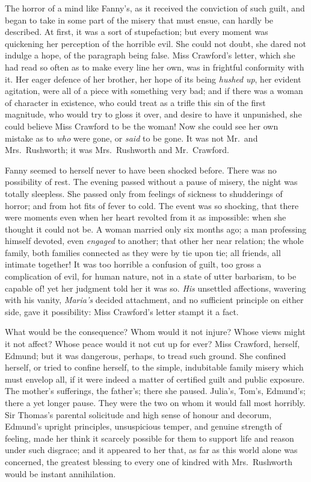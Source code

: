 \documentclass{article}
\begin{document}
The horror of a mind like Fanny's, as it received the
conviction of such guilt, and began to take in some part
of the misery that must ensue, can hardly be described.
At first, it was a sort of stupefaction; but every moment
was quickening her perception of the horrible evil.
She could not doubt, she dared not indulge a hope,
of the paragraph being false.  Miss Crawford's letter,
which she had read so often as to make every line her own,
was in frightful conformity with it.  Her eager defence
of her brother, her hope of its being \emph{hushed} \emph{up},
her evident agitation, were all of a piece with something
very bad; and if there was a woman of character in existence,
who could treat as a trifle this sin of the first magnitude,
who would try to gloss it over, and desire to have it
unpunished, she could believe Miss Crawford to be the woman!
Now she could see her own mistake as to \emph{who} were gone,
or \emph{said} to be gone.  It was not Mr.\ and Mrs.\ Rushworth;
it was Mrs.\ Rushworth and Mr.\ Crawford.

Fanny seemed to herself never to have been shocked before.
There was no possibility of rest.  The evening passed
without a pause of misery, the night was totally sleepless.
She passed only from feelings of sickness to shudderings
of horror; and from hot fits of fever to cold.  The event
was so shocking, that there were moments even when her
heart revolted from it as impossible:  when she thought
it could not be.  A woman married only six months ago;
a man professing himself devoted, even \emph{engaged} to another;
that other her near relation; the whole family,
both families connected as they were by tie upon tie;
all friends, all intimate together!  It was too horrible
a confusion of guilt, too gross a complication of evil,
for human nature, not in a state of utter barbarism,
to be capable of! yet her judgment told her it was so.
\emph{His} unsettled affections, wavering with his vanity,
\emph{Maria's} decided attachment, and no sufficient principle
on either side, gave it possibility:  Miss Crawford's
letter stampt it a fact.

What would be the consequence?  Whom would it not injure?
Whose views might it not affect?  Whose peace would it
not cut up for ever?  Miss Crawford, herself, Edmund;
but it was dangerous, perhaps, to tread such ground.
She confined herself, or tried to confine herself, to the simple,
indubitable family misery which must envelop all, if it were
indeed a matter of certified guilt and public exposure.
The mother's sufferings, the father's; there she paused.
Julia's, Tom's, Edmund's; there a yet longer pause.
They were the two on whom it would fall most horribly.
Sir Thomas's parental solicitude and high sense of honour
and decorum, Edmund's upright principles, unsuspicious temper,
and genuine strength of feeling, made her think it
scarcely possible for them to support life and reason
under such disgrace; and it appeared to her that, as far
as this world alone was concerned, the greatest blessing
to every one of kindred with Mrs.\ Rushworth would be
instant annihilation.
\end{document}
